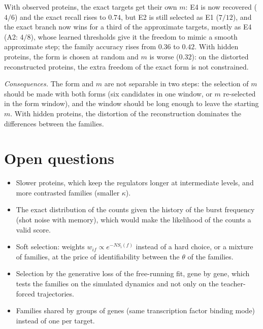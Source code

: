 \documentclass[a4paper, 11pt]{article}
\theoremstyle{plain}
\theoremstyle{remark}
\begin{document}
With observed proteins, the exact targets get their own $m$: E4 is now recovered ($4/6$) and the exact recall rises to $0.74$, but E2 is still selected as E1 ($7/12$), and the exact branch now wins for a third of the approximate targets, mostly as E4 (A2: $4/8$), whose learned thresholds give it the freedom to mimic a smooth approximate step; the family accuracy rises from $0.36$ to $0.42$. With hidden proteins, the form is chosen at random and $m$ is worse ($0.32$): on the distorted reconstructed proteins, the extra freedom of the exact form is not constrained.

\emph{Consequences.} The form and $m$ are not separable in two steps: the selection of $m$ should be made with both forms (six candidates in one window, or $m$ re-selected in the form window), and the window should be long enough to leave the starting $m$. With hidden proteins, the distortion of the reconstruction dominates the differences between the families.

\section{Open questions}\label{sec:open}

\begin{itemize}[nosep]
\item Slower proteins, which keep the regulators longer at intermediate levels, and more contrasted families (smaller $\kappa$).
\item The exact distribution of the counts given the history of the burst frequency (shot noise with memory), which would make the likelihood of the counts a valid score.
\item Soft selection: weights $w_{if} \propto e^{-N S_i(f)}$ instead of a hard choice, or a mixture of families, at the price of identifiability between the $\theta$ of the families.
\item Selection by the generative loss of the free-running fit, gene by gene, which tests the families on the simulated dynamics and not only on the teacher-forced trajectories.
\item Families shared by groups of genes (same transcription factor binding mode) instead of one per target.
\end{itemize}
\end{document}
